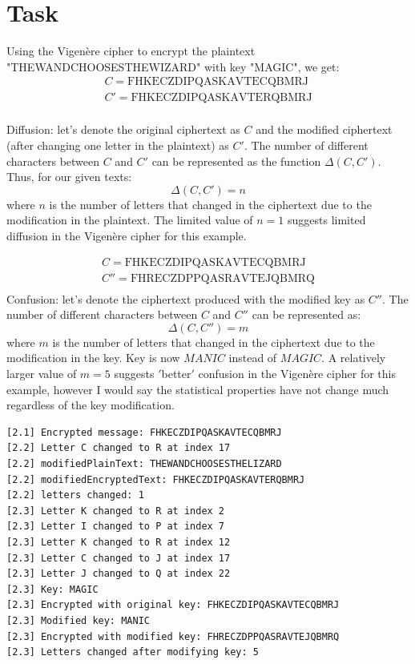 \documentclass{article}
\begin{document}
\section{Task}%
Using the Vigenère cipher to encrypt the plaintext "THEWANDCHOOSESTHEWIZARD" with key "MAGIC", we get:
\begin{gather*}
    C = \text{{FHKECZDIPQASKAVTECQBMRJ}}\\
    C' = \text{{FHKECZDIPQASKAVTERQBMRJ}}\\
\end{gather*}

Diffusion: let's denote the original ciphertext as \( C \) and the modified ciphertext (after changing one letter in the plaintext) as \(
C' \).
The number of different characters between \( C \) and \( C' \) can be represented as the function \( \Delta(C, C') \).
Thus, for our given texts:
\[ \Delta(C, C') = n \]
where \( n \) is the number of letters that changed in the ciphertext due to the modification in the plaintext.
The limited value of \( n=1 \) suggests limited diffusion in the Vigenère cipher for this example.

\begin{gather*}
    C = \text{{FHKECZDIPQASKAVTECQBMRJ}}\\
    C'' = \text{{FHRECZDPPQASRAVTEJQBMRQ}}\\
\end{gather*}
Confusion: let's denote the ciphertext produced with the modified key as \( C'' \).
The number of different characters between \( C \) and \( C'' \) can be represented as:
\[ \Delta(C, C'') = m \]
where \( m \) is the number of letters that changed in the ciphertext due to the modification in the key.
Key is now \( MANIC \) instead of \( MAGIC \).
A relatively larger value of \( m=5 \) suggests \('\)better\('\) confusion in the Vigenère cipher for this example, however
I would say the statistical properties have not change much regardless of the key modification.\\

\begin{verbatim}
[2.1] Encrypted message: FHKECZDIPQASKAVTECQBMRJ
[2.2] Letter C changed to R at index 17
[2.2] modifiedPlainText: THEWANDCHOOSESTHELIZARD
[2.2] modifiedEncryptedText: FHKECZDIPQASKAVTERQBMRJ
[2.2] letters changed: 1
[2.3] Letter K changed to R at index 2
[2.3] Letter I changed to P at index 7
[2.3] Letter K changed to R at index 12
[2.3] Letter C changed to J at index 17
[2.3] Letter J changed to Q at index 22
[2.3] Key: MAGIC
[2.3] Encrypted with original key: FHKECZDIPQASKAVTECQBMRJ
[2.3] Modified key: MANIC
[2.3] Encrypted with modified key: FHRECZDPPQASRAVTEJQBMRQ
[2.3] Letters changed after modifying key: 5
\end{verbatim}
\end{document}
